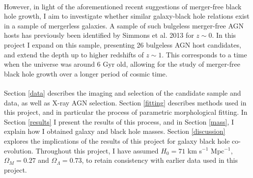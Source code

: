 \documentclass[11pt,twocolumn]{article}
\begin{document}
\paragraph{} However, in light of the aforementioned recent suggestions of merger-free black hole growth, I aim to investigate whether similar galaxy-black hole relations exist in a sample of mergerless galaxies. A sample of such bulgeless merger-free AGN hosts has previously been identified by Simmons et al. 2013 \cite{Simmons01032013} for $z\sim 0$. In this project I expand on this sample, presenting 26 bulgeless AGN host candidates, and extend the depth up to higher redshifts of $ z\sim 1$. This corresponds to a time when the universe was around 6 Gyr old, allowing for the study of merger-free black hole growth over a longer period of cosmic time. 
\paragraph{} Section \ref{data} describes the imaging and selection of the candidate sample and data, as well as X-ray AGN selection. Section \ref{fitting} describes methods used in this project, and in particular the process of parametric morphological fitting. In Section \ref{results} I present the results of this process, and in Section \ref{mass}, I explain how I obtained galaxy and black hole masses. Section \ref{discussion} explores the implications of the results of this project for galaxy black hole co-evolution. Throughout this project, I have assumed $H_{0} = 71$  km s$^{-1}$ Mpc$^{-1}$, $\Omega_{M} = 0.27$ and $\Omega_{\Lambda} = 0.73$, to retain consistency with earlier data used in this project. 
\paragraph{}
\end{document}
